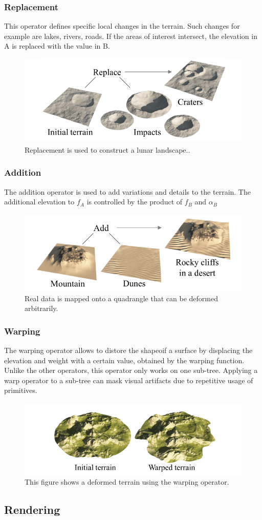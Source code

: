 \subsubsection{Replacement}
This operator defines specific local changes in the terrain. Such changes for example are lakes, rivers, roads. If the areas of interest intersect, the elevation in A is replaced with the value in B. 
\begin{figure}[htb]
	\centering
	\includegraphics[width=.8\linewidth]{CGFCGF12530/replace_operator}
	\caption{Replacement is used to construct a lunar landscape..}
	\label{fig:replace_operator}
\end{figure}
\subsubsection{Addition}
The addition operator is used to add variations and details to the terrain. The additional elevation to $f_A$ is controlled by the product of $f_B$ and $\alpha_B$
\begin{figure}[htb]
	\centering
	\includegraphics[width=.8\linewidth]{CGFCGF12530/addition_operator}
	\caption{Real data is mapped onto a quadrangle that can be deformed arbitrarily.}
	\label{fig:addition_operator}
\end{figure}
\subsubsection{Warping}
The warping operator allows to distore the shapeoif a surface by displacing the elevation and weight with a certain value, obtained by the warping function. Unlike the other operators, this operator only works on one sub-tree. 
Applying a warp operator to a sub-tree can mask visual artifacts due to repetitive usage of primitives. 
\begin{figure}[htb]
	\centering
	\includegraphics[width=.8\linewidth]{CGFCGF12530/warp_operator}
	\caption{This figure shows a deformed terrain using the warping operator.}
	\label{fig:warp_operator}
\end{figure}
\subsection{Rendering}